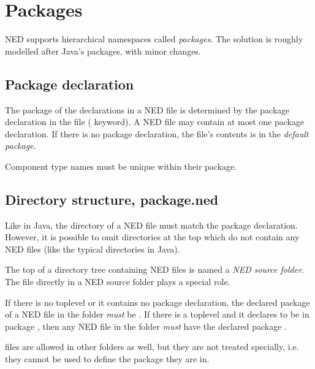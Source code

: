 \section{Packages}
\label{ch-ned-ref:sec:packages}

NED supports hierarchical namespaces called \textit{packages}. The solution
is roughly modelled after Java's packages, with minor changes.


\subsection{Package declaration}

The package of the declarations in a NED file is determined by the package
declaration in the file ( keyword). A NED file may contain at
most one package declaration. If there is no package declaration, the file's
contents is in the \textit{default package}.

Component type names must be unique within their package.


\subsection{Directory structure, package.ned}

Like in Java, the directory of a NED file must match the package
declaration. However, it is possible to omit directories at the top which do
not contain any NED files (like the typical 
directories in Java).

The top of a directory tree containing NED files is named a \textit{NED source
folder}. The  file directly in a NED source folder plays a
special role.

If there is no toplevel  or it contains no package declaration,
the declared package of a NED file in the folder 
\textit{must} be .
If there is a toplevel  and it declares to be in package
, then any NED file in the folder 
\textit{must} have the declared package .

\begin{note}
     files are allowed in other folders as well, but they
    are not treated specially, i.e. they cannot be used to define the package
    they are in.
\end{note}




